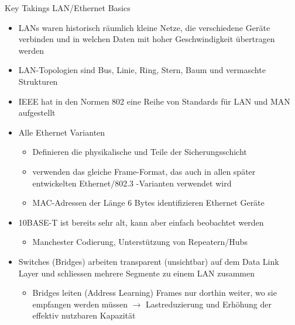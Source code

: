 \begin{KR}{Key Takings LAN/Ethernet Basics}
    \begin{itemize}
        \item LANs waren historisch räumlich kleine Netze, die verschiedene Geräte verbinden und in welchen Daten mit hoher Geschwindigkeit übertragen werden
        \item LAN-Topologien sind Bus, Linie, Ring, Stern, Baum und vermaschte Strukturen
        \item IEEE hat in den Normen 802 eine Reihe von Standards für LAN und MAN aufgestellt
        \item Alle Ethernet Varianten
        \begin{itemize}
            \item Definieren die physikalische und Teile der Sicherungsschicht
            \item verwenden das gleiche Frame-Format, das auch in allen später entwickelten Ethernet/802.3 -Varianten verwendet wird
            \item MAC-Adressen der Länge 6 Bytes identifizieren Ethernet Geräte
        \end{itemize}
        \item 10BASE-T ist bereits sehr alt, kann aber einfach beobachtet werden
        \begin{itemize}
            \item Manchester Codierung, Unterstützung von Repeatern/Hubs
        \end{itemize}
        \item Switches (Bridges) arbeiten transparent (unsichtbar) auf dem Data Link Layer und schliessen mehrere Segmente zu einem LAN zusammen
        \begin{itemize}
            \item Bridges leiten (Address Learning) Frames nur dorthin weiter, wo sie empfangen werden müssen $\longrightarrow$ Lastreduzierung und Erhöhung der effektiv nutzbaren Kapazität
        \end{itemize}
    \end{itemize}
\end{KR}

